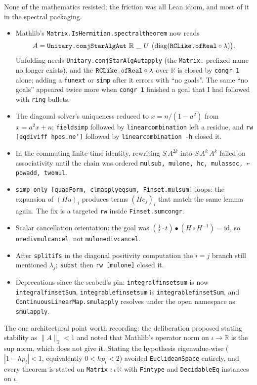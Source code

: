 \documentclass[11pt]{article}
\newcommand{\R}{\mathbb{R}}
\newcommand{\code}[1]{{\def\_{\textunderscore\allowbreak}\texttt{#1}}}
\begin{document}
None of the mathematics resisted; the friction was all Lean idiom, and
most of it in the spectral packaging.
\begin{itemize}\raggedright
\item Mathlib's \code{Matrix.IsHermitian.spectral\_theorem} now reads
\[
A = \code{Unitary.conjStarAlgAut}\ \R\ \_\ U\
\big(\mathrm{diag}(\code{RCLike.ofReal} \circ \lambda)\big).
\]
Unfolding needs \code{Unitary.conjStarAlgAut\_apply}
(the \code{Matrix.}-prefixed name no longer exists), and the
$\code{RCLike.ofReal} \circ \lambda$ over $\R$ is closed by \code{congr 1}
alone; adding a \code{funext} or \code{simp} after it errors with ``no
goals''. The same ``no goals'' appeared twice more when \code{congr 1}
finished a goal that I had followed with \code{ring} bullets.
\item The diagonal solver's uniqueness reduced to $x = n/(1 - a^2)$ from
$x = a^2x + n$; \code{field\_simp} followed by \code{linear\_combination}
left a residue, and \code{rw [eq\_div\_iff hpos.ne']} followed by
\code{linear\_combination -h} closed it.
\item In the commuting finite-time identity, rewriting $S\,A^{2k}$ into
$S\,A^k\,A^k$ failed on associativity until the chain was ordered
\code{mul\_sub, mul\_one, hc, mul\_assoc, ← pow\_add, two\_mul}.
\item \code{simp only [quadForm, clm\_apply\_eq\_sum, Finset.mul\_sum]}
loops: the expansion of $(Hu)_i$ produces terms $(He_j)_i$ that match the
same lemma again. The fix is a targeted \code{rw} inside
\code{Finset.sum\_congr}.
\item Scalar cancellation orientation: the goal was $(\tfrac1t\cdot t)
\bullet (H \circ H^{-1}) = \mathrm{id}$, so \code{one\_div\_mul\_cancel},
not \code{mul\_one\_div\_cancel}.
\item After \code{split\_ifs} in the diagonal positivity computation the
$i = j$ branch still mentioned $\lambda_j$; \code{subst} then
\code{rw [mul\_one]} closed it.
\item Deprecations since the seabed's pin: \code{integral\_finset\_sum}
is now \code{integral\_finsetSum}, \code{integrable\_finset\_sum} is
\code{integrable\_finsetSum}, and \code{ContinuousLinearMap.smul\_apply}
resolves under the open namespace as \code{smul\_apply}.
\end{itemize}
The one architectural point worth recording: the deliberation proposed
stating stability as $\|A\|_2 < 1$ and noted that Mathlib's operator norm
on $\iota \to \R$ is the sup norm, which does not give it. Stating the
hypothesis eigenvalue-wise ($|1 - hp_i| < 1$, equivalently $0 < hp_i <
2$) avoided \code{EuclideanSpace} entirely, and every theorem is stated
on \code{Matrix} $\iota\,\iota\,\R$ with \code{Fintype} and \code{DecidableEq} instances on $\iota$.
\end{document}
